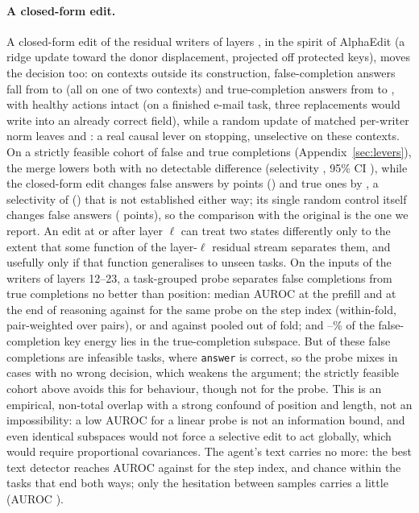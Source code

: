 \paragraph{A closed-form edit.} A closed-form edit of the \alphaNWriters{} residual writers of layers \alphaLayers{}, in the spirit of AlphaEdit \citep{fang2024alphaedit} (a ridge update toward the donor displacement, projected off protected keys), moves the decision too: on contexts outside its construction, false-completion answers fall from \alphaOrigFsp{} to \alphaEditFsp{} (all on one of two contexts) and true-completion answers from \alphaOrigFsm{} to \alphaEditFsm, with healthy actions intact (on a finished e-mail task, three replacements would write into an already correct field), while a random update of matched per-writer norm leaves \alphaRandFsp{} and \alphaRandFsm: a real causal lever on stopping, unselective on these contexts. On a strictly feasible cohort of \pwOrigTasks{} false and \pwFsm{} true completions (Appendix~\ref{sec:levers}), the merge lowers both with no detectable difference (selectivity \pwCuaSel, 95\% CI \pwCuaSelCi), while the closed-form edit changes false answers by \pwBroadDeltaFsp{} points (\pwBroadCiFsp) and true ones by \pwBroadDeltaFsm, a selectivity of \pwBroadSel{} (\pwBroadSelCi) that is not established either way; its single random control itself changes false answers (\pwRandDeltaFsp{} points), so the comparison with the original is the one we report. An edit at or after layer $\ell$ can treat two states differently only to the extent that some function of the layer-$\ell$ residual stream separates them, and usefully only if that function generalises to unseen tasks. On the inputs of the \rmWriters{} writers of layers 12--23, a task-grouped probe separates \rmFsp{} false completions from \rmFsm{} true completions no better than position: median AUROC \rmPreAuc{} at the prefill and \rmEndAuc{} at the end of reasoning against \rmBaseStep{} for the same probe on the step index (within-fold, pair-weighted over \rmPairs{} pairs), or \rmPreOof{} and \rmEndOof{} against \rmBaseStepOof{} pooled out of fold; and \rmEndEnergy--\rmPreEnergy\% of the false-completion key energy lies in the true-completion subspace. But \rmFspInfeasible{} of these \rmFsp{} false completions are infeasible tasks, where \texttt{answer} is correct, so the probe mixes in cases with no wrong decision, which weakens the argument; the strictly feasible cohort above avoids this for behaviour, though not for the probe. This is an empirical, non-total overlap with a strong confound of position and length, not an impossibility: a low AUROC for a linear probe is not an information bound, and even identical subspaces would not force a selective edit to act globally, which would require proportional covariances. The agent's text carries no more: the best text detector reaches AUROC \tsBestAuc{} against \tsStepAuc{} for the step index, and chance within the \tsMixed{} tasks that end both ways; only the hesitation between samples carries a little (AUROC \tsConsAuc).



